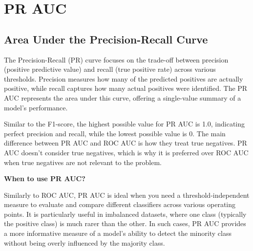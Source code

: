 \clearpage
\thispagestyle{classificationstyle}
\section{PR AUC}
\subsection{Area Under the Precision-Recall Curve}

The Precision-Recall (PR) curve focuses on the trade-off between precision (positive predictive value) and recall (true positive rate) across various thresholds.
Precision measures how many of the predicted positives are actually positive, while recall captures how many actual positives were identified.
The PR AUC represents the area under this curve, offering a single-value summary of a model's performance.

\begin{center}
\end{center}

Similar to the F1-score, the highest possible value for PR AUC is 1.0, indicating perfect precision and recall, while the lowest possible value is 0.
The main difference between PR AUC and ROC AUC is how they treat true negatives. PR AUC doesn't consider true negatives, which is why it is preferred over ROC AUC
when true negatives are not relevant to the problem.

\textbf{When to use PR AUC?}

Similarly to ROC AUC, PR AUC is ideal when you need a threshold-independent measure to evaluate and compare different classifiers across various operating points. 
It is particularly useful in imbalanced datasets, where one class (typically the positive class) is much rarer than the other. In such cases, PR AUC provides a more
informative measure of a model's ability to detect the minority class without being overly influenced by the majority class.

